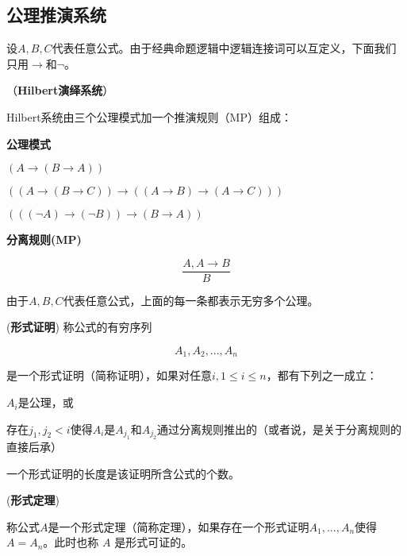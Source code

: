 \subsection{公理推演系统}

设$A, B, C$代表任意公式。由于经典命题逻辑中逻辑连接词可以互定义，下面我们只用$\to$和$\neg$。

\begin{defn}（\textbf{Hilbert演绎系统}）

Hilbert系统由三个公理模式加一个推演规则（MP）组成：

\textbf{公理模式}

\begin{tightenum}
  \item $(A \to (B \to A))$
  \item $((A \to (B \to C)) \to ((A \to B) \to (A \to C)))$
  \item $(((\neg A) \to (\neg B)) \to (B \to A))$
\end{tightenum}


\textbf{分离规则(MP)}

$$\frac {A, A \to B } {B} $$

\end{defn}





\begin{rem}
由于$A,B,C$代表任意公式，上面的每一条都表示无穷多个公理。
\end{rem}


\begin{defn}(\textbf{形式证明}) 称公式的有穷序列

$$A_1, A_2, ... , A_n$$

是一个形式证明（简称证明），如果对任意$i, 1 \leq i \leq n$，都有下列之一成立：
\begin{tightenum}
 \item $A_i$是公理，或
 \item 存在$j_1, j_2 < i$使得$A_i$是$A_{j_1}$和$A_{j_2}$通过分离规则推出的（或者说，是关于分离规则的直接后承）
\end{tightenum}
\end{defn}

一个形式证明的长度是该证明所含公式的个数。



\begin{defn} (\textbf{形式定理})

称公式$A$是一个形式定理（简称定理），如果存在一个形式证明$A_1, ..., A_n$使得$A = A_n$。此时也称
$A$ 是形式可证的。

\end{defn}


